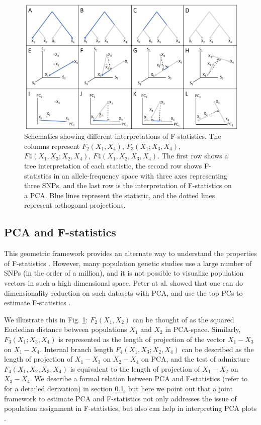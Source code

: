 \documentclass[12pt, letterpaper]{article}
\begin{document}
\begin{figure}[ht!]
    \includegraphics[width=16.5cm]{ppt/schematic_fstats_ppca1.png}
    \centering
    \caption{Schematics showing different interpretations of F-statistics. The columns represent $F_2(X_1,X_4)$, $F_3(X_1;X_3,X_4)$, $F4(X_1,X_3;X_2,X_4)$, $F4(X_1,X_2,X_3,X_4)$. The first row shows a tree interpretation of each statistic, the second row shows F-statistics in an allele-frequency space with three axes representing three SNPs, and the last row is the interpretation of F-statistics on a PCA. Blue lines represent the statistic, and the dotted lines represent orthogonal projections.}
    \label{fig2:overview}
\end{figure}


\subsection{PCA and F-statistics}\label{theory-pca-fstats}

This geometric framework provides an alternate way to understand the properties of F-statistics \cite{oteo-garcia_geometrical_2021}. However, many population genetic studies use a large number of SNPs (in the order of a million), and it is not possible to visualize population vectors in such a high dimensional space. Peter at al. showed that one can do dimensionality reduction on such datasets with PCA, and use the top PCs to estimate F-statistics \cite{peter_geometric_2022}.

We illustrate this in Fig. \ref{fig2:overview}:  $F_2(X_1,X_2)$ can be thought of as the squared Eucledian distance between populations $X_1$ and $X_2$ in PCA-space. Similarly, $F_3(X_1;X_3,X_4)$ is represented as the length of projection of the vector $X_1-X_3$ on $X_1-X_4$. Internal branch length $F_4(X_1,X_3;X_2,X_4)$ can be described as the length of projection of $X_1-X_3$ on $X_2-X_4$ on PCA, and the test of admixture $F_4(X_1,X_2,X_3,X_4)$ is equivalent to the length of projection of $X_1-X_2$ on $X_3-X_4$. We describe a formal relation between PCA and F-statistics (refer to \cite{peter_geometric_2022} for a detailed derivation) in section \ref{theory-pca-fstats}, but here we point out that a joint framework to estimate PCA and F-statistics not only addresses the issue of population assignment in F-statistics, but also can help in interpreting PCA plots \cite{novembre_genes_2008, noauthor_cavalli-sforza_nodate, degiorgio_geographic_2013, francois_principal_2010}. 
\end{document}
